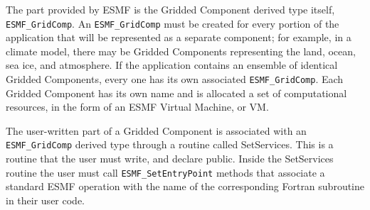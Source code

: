 The part provided by ESMF is the Gridded Component derived type 
itself, {\tt ESMF\_GridComp}.  An {\tt ESMF\_GridComp} must be created 
for every portion of the application that will be represented 
as a separate component; for example, in a climate model, there may 
be Gridded Components representing the land, ocean, sea ice, and 
atmosphere.  If the application contains an ensemble of identical 
Gridded Components, every one has its own associated {\tt ESMF\_GridComp}.
Each Gridded Component has its own name and is allocated
a set of computational resources, in the form of an ESMF Virtual
Machine, or VM.

The user-written part of a Gridded Component is associated with an
{\tt ESMF\_GridComp} derived type through a routine called SetServices.
This is a routine that the user must write, and declare public.
Inside the SetServices routine the user must call  
{\tt ESMF\_SetEntryPoint} methods that associate a standard ESMF 
operation with the name of the corresponding Fortran subroutine in their user code.  









